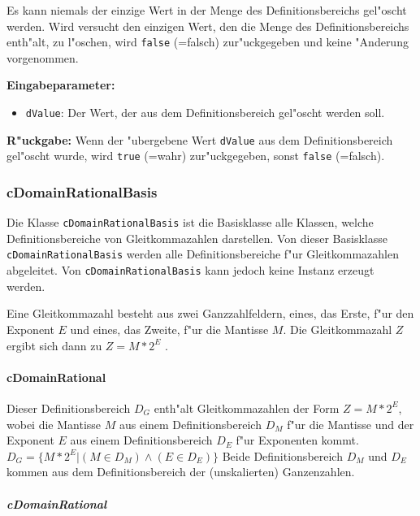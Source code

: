 Es kann niemals der einzige Wert in der Menge des Definitionsbereichs gel"oscht werden. Wird versucht den einzigen Wert, den die Menge des Definitionsbereichs enth"alt, zu l"oschen, wird \verb|false| (=falsch) zur"uckgegeben und keine "Anderung vorgenommen.

\bigskip\noindent
\textbf{Eingabeparameter:}
\begin{itemize}
 \item \verb|dValue|: Der Wert, der aus dem Definitionsbereich gel"oscht werden soll.
\end{itemize}

\bigskip\noindent
\textbf{R"uckgabe:}  Wenn der "ubergebene Wert \verb|dValue| aus dem Definitionsbereich gel"oscht wurde, wird \verb|true| (=wahr) zur"uckgegeben, sonst \verb|false| (=falsch).



\subsubsection{cDomainRationalBasis}

Die Klasse \verb|cDomainRationalBasis| ist die Basisklasse alle Klassen, welche Definitionsbereiche von Gleitkommazahlen darstellen.
Von dieser Basisklasse \verb|cDomainRationalBasis| werden alle Definitionsbereiche f"ur Gleitkommazahlen abgeleitet. Von \verb|cDomainRationalBasis| kann jedoch keine Instanz erzeugt werden.

Eine Gleitkommazahl besteht aus zwei Ganzzahlfeldern, eines, das Erste, f"ur den Exponent $E$ und eines, das Zweite, f"ur die Mantisse $M$. Die Gleitkommazahl $Z$ ergibt sich dann zu $Z=M*2^E$ .


\paragraph{cDomainRational}

Dieser Definitionsbereich $D_G$ enth"alt Gleitkommazahlen der Form $Z=M*2^E$, wobei die Mantisse $M$ aus einem Definitionsbereich $D_M$ f"ur die Mantisse und der Exponent $E$ aus einem Definitionsbereich $D_E$ f"ur Exponenten kommt. $D_G=\{ M*2^E | (M \in D_M) \wedge (E \in D_E)\}$ Beide Definitionsbereich $D_M$ und $D_E$ kommen aus dem Definitionsbereich der (unskalierten) Ganzenzahlen.


\subparagraph{cDomainRational}


